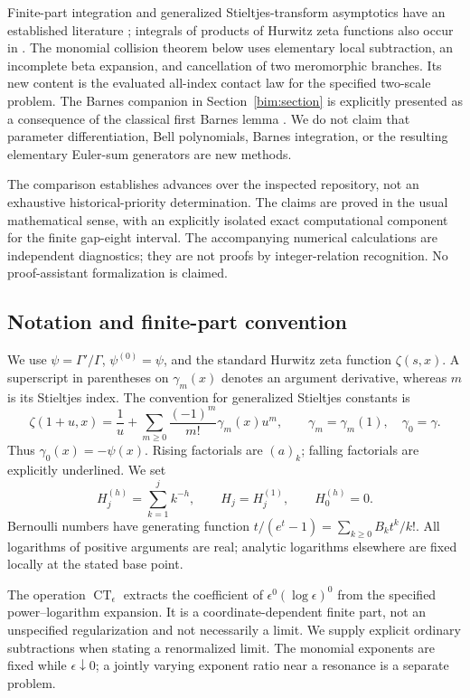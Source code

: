 Finite-part integration and generalized Stieltjes-transform asymptotics
have an established literature \cite{TicaGalapon}; integrals of products
of Hurwitz zeta functions also occur in \cite{ShpotParis}. The monomial
collision theorem below uses elementary local subtraction, an incomplete
beta expansion, and cancellation of two meromorphic branches. Its new
content is the evaluated all-index contact law for the specified
two-scale problem. The Barnes companion in Section~\ref{bim:section}
is explicitly presented as a consequence of the classical first Barnes
lemma \cite[5.13.3]{DLMF}. We do not claim that parameter differentiation,
Bell polynomials, Barnes integration, or the resulting elementary
Euler-sum generators are new methods.

The comparison establishes advances over the inspected repository,
not an exhaustive historical-priority determination. The claims are
proved in the usual mathematical sense, with an explicitly isolated
exact computational component for the finite gap-eight interval.
The accompanying numerical calculations are independent diagnostics;
they are not proofs by integer-relation recognition. No proof-assistant
formalization is claimed.

\subsection{Notation and finite-part convention}

We use $\psi=\Gamma'/\Gamma$, $\psi^{(0)}=\psi$, and the standard
Hurwitz zeta function $\zeta(s,x)$. A superscript in parentheses on
$\gamma_m(x)$ denotes an argument derivative, whereas $m$ is its
Stieltjes index. The convention for generalized Stieltjes constants is
\[
 \zeta(1+u,x)=\frac1u+
       \sum_{m\ge0}\frac{(-1)^m}{m!}\gamma_m(x)u^m,
 \qquad \gamma_m=\gamma_m(1),\quad\gamma_0=\gamma.
\]
Thus $\gamma_0(x)=-\psi(x)$. Rising factorials are $(a)_k$;
falling factorials are explicitly underlined. We set
\[
 H_j^{(h)}=\sum_{k=1}^j k^{-h},\qquad H_j=H_j^{(1)},
 \qquad H_0^{(h)}=0.
\]
Bernoulli numbers have generating function
$t/(e^t-1)=\sum_{k\ge0}B_k t^k/k!$.
All logarithms of positive arguments are real; analytic logarithms
elsewhere are fixed locally at the stated base point.

The operation $\operatorname{CT}_{\epsilon}$ extracts the coefficient
of $\epsilon^0(\log\epsilon)^0$ from the specified power--logarithm
expansion. It is a coordinate-dependent finite part, not an unspecified
regularization and not necessarily a limit. We supply explicit ordinary
subtractions when stating a renormalized limit. The monomial exponents
are fixed while $\epsilon\downarrow0$; a jointly varying exponent ratio
near a resonance is a separate problem.
